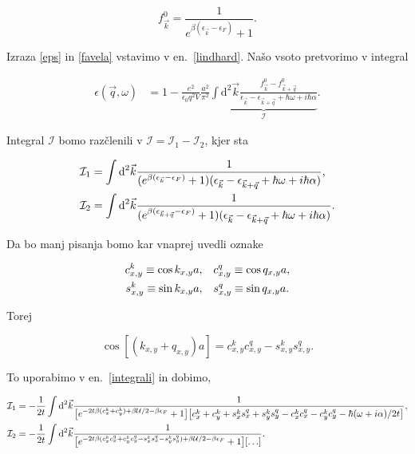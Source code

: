 \documentclass[a4paper, 12pt]{article}
\newcommand{\vq}{
	\ensuremath{\vec{q}}
}
\newcommand{\w}{
	\ensuremath{\omega}
}
\newcommand{\e}{
	\ensuremath{\epsilon}
}
\newcommand{\vk}{
	\ensuremath{\vec{k}}
}
\renewcommand{\ni}{
	\noindent
}
\newcommand{\pred}{
	\ensuremath{\frac{e^2}{\e_0 q^2 V}}
}
\newcommand{\dd}{
	\ensuremath{\text{d}}
}
\newcommand{\I}{
	\ensuremath{\mathcal{I}}
}
\begin{document}
\begin{equation}
	f_{\vk}^0 = \frac{1}{e^{\beta(\e_{\vk} - \e_F)} + 1}.
	\label{favela}
\end{equation}

\ni Izraza \eqref{eps} in \eqref{favela} vstavimo v en.~\eqref{lindhard}. Na\v so vsoto pretvorimo
v integral

\begin{align}
	\e(\vq, \w) &= 1 - \pred \frac{a^2}{\pi^2} \underbrace{ \int\dd^2 \vk \frac{f^0_{\vk} -
		f^0_{\vk+\vq}}{\e_{\vk} - \e_{\vk+\vq} + \hbar\w + i\hbar\alpha}}_{\I}.
\end{align}

\ni Integral $\I$ bomo raz\v clenili v $\I = \I_1 - \I_2$, kjer sta

\begin{align}
	\I_1 &= \int\dd^2 \vk \frac{1}{(e^{\beta(\e_{\vk} - \e_F)} + 1)
		(\e_{\vk} - \e_{\vk + \vq} + \hbar\w + i\hbar\alpha)}, \notag \\
	\I_2 &= \int\dd^2 \vk \frac{1}{(e^{\beta(\e_{\vk+\vq} - \e_F)} + 1)
		(\e_{\vk} - \e_{\vk + \vq} + \hbar\w + i\hbar\alpha)}.
	\label{integrali}
\end{align}

\ni Da bo manj pisanja bomo kar vnaprej uvedli oznake

\begin{align}
	c_{x,y}^k \equiv \cos k_{x,y} a, &\quad	c_{x,y}^q \equiv \cos q_{x,y} a, \notag \\
	s_{x,y}^k \equiv \sin k_{x,y} a, &\quad s_{x,y}^q \equiv \sin q_{x,y} a.
\end{align}

\ni Torej

\begin{equation}
	\cos [(k_{x,y} + q_{x,y}) a] = c_{x,y}^k c_{x,y}^q - s_{x,y}^k s_{x,y}^q.
\end{equation}

\ni To uporabimo v en.~\eqref{integrali} in dobimo, 

\begin{align}
	\I_1 &= -\frac{1}{2t}\int \dd^2 \vk \frac{1}
		{\big[e^{-2t\beta(c_x^k + c_y^k) + \beta\mathcal{U}/2 - \beta\e_F} + 1\big]
		\big[c_x^k + c_y^k + s_x^k s_x^q + s_y^k s_y^q - c_x^k c_x^q - c_y^k c_y^q -
		\hbar(\w + i\alpha)/2t\big]}, \notag \\
	\I_2 &= -\frac{1}{2t}\int \dd^2 \vk \frac{1}
		{\big[e^{-2t\beta (c_x^k c_x^q + c_y^k c_y^q - s_x^k s_x^q - s_y^k s_y^q) + 
		\beta\mathcal{U}/2 - \beta\e_F} + 1\big][ \ldots ]}.
\end{align}
\end{document}
